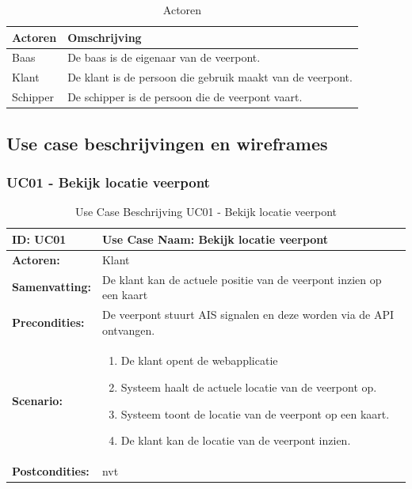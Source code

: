 \documentclass{article}
\begin{document}
\begin{table}[H]
    \centering
    \begin{tabularx}{\textwidth}{|l|X|}
        \hline
        \textbf{Actoren} & \textbf{Omschrijving}  \\
        \hline
        Baas & De baas is de eigenaar van de veerpont. \\
        \hline
        Klant  & De klant is de persoon die gebruik maakt van de veerpont. \\
        \hline
        Schipper & De schipper is de persoon die de veerpont vaart. \\
        \hline

    \end{tabularx}
    \caption{Actoren}
\end{table}

\subsection{Use case beschrijvingen en wireframes}
\label{sec:ucb}
\subsubsection{UC01 - Bekijk locatie veerpont}
\begin{table}[H]
    \centering
    \begin{tabularx}{\textwidth}{|l|X|}
        \hline
        \textbf{ID:} UC01 & \textbf{Use Case Naam:} Bekijk locatie veerpont  \\
        \hline
        \textbf{Actoren:} & Klant \\
        \hline
        \textbf{Samenvatting:}  & De klant kan de actuele positie van de veerpont inzien op een kaart \\
        \hline 
        \textbf{Precondities:} & De veerpont stuurt AIS signalen en deze worden via de API ontvangen. \\
        \hline
        \textbf{Scenario:} & \begin{enumerate}
            \item De klant opent de webapplicatie
            \item Systeem haalt de actuele locatie van de veerpont op.
            \item Systeem toont de locatie van de veerpont op een kaart.
            \item De klant kan de locatie van de veerpont inzien.
        \end{enumerate} \\
        \hline 
        \textbf{Postcondities:} & nvt \\ 
        \hline

    \end{tabularx}
    \caption{Use Case Beschrijving UC01 - Bekijk locatie veerpont}
\end{table}
\end{document}

